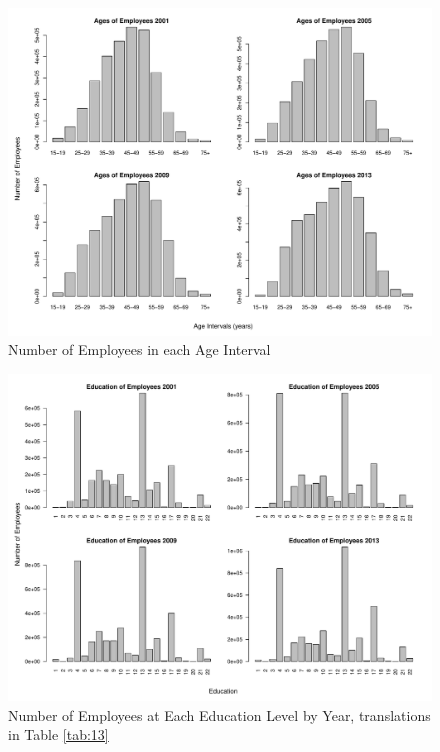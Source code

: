 \documentclass{article}
\begin{document}
\begin{center}
    \begin{figure}
        \includegraphics[scale=0.4]{./images/histogram-ages-2001-2013.pdf}
        \caption{Number of Employees in each Age Interval}
        \label{agehistograms}
    \end{figure}
\end{center}

\begin{center}
    \begin{figure}
        \includegraphics[scale=0.4]{./images/education-histograms.pdf}
        \caption{Number of Employees at Each Education Level by Year, translations in Table \ref{tab:13}}
        \label{eduhistograms}
    \end{figure}
\end{center}
\end{document}
